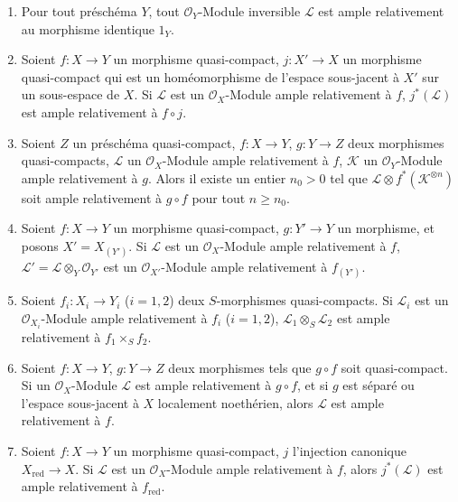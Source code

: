 \begin{proposition}[4.6.13]
\label{II.4.6.13-fr}
\begin{enumerate}
  \item[\rm{(i)}] Pour tout préschéma $Y$, tout
  $\mathcal{O}_Y$-Module inversible $\mathcal{L}$ est ample relativement
  au morphisme identique $1_Y$.
  \item[\rm{(i bis)}] Soient $f:X\to Y$ un morphisme quasi-compact,
  $j:X'\to X$ un morphisme quasi-compact qui est un homéomorphisme de
  l'espace sous-jacent à $X'$ sur un sous-espace de $X$. Si $\mathcal{L}$
  est un $\mathcal{O}_X$-Module ample relativement à $f$,
  $j^*(\mathcal{L})$ est ample relativement à $f\circ j$.
  \item[\rm{(ii)}] Soient $Z$ un préschéma quasi-compact, $f:X\to Y$,
  $g:Y\to Z$ deux morphismes quasi-compacts, $\mathcal{L}$ un
  $\mathcal{O}_X$-Module ample relativement à $f$, $\mathcal{K}$ un
  $\mathcal{O}_Y$-Module ample relativement à $g$. Alors il existe un
  entier $n_0>0$ tel que
  $\mathcal{L}\otimes f^*(\mathcal{K}^{\otimes n})$ soit ample relativement
  à $g\circ f$ pour tout $n\geq n_0$.
  \item[\rm{(iii)}] Soient $f:X\to Y$ un morphisme quasi-compact,
  $g:Y'\to Y$ un morphisme, et posons $X'=X_{(Y')}$. Si $\mathcal{L}$ est
  un $\mathcal{O}_X$-Module ample relativement à $f$,
  $\mathcal{L}'=\mathcal{L}\otimes_Y\mathcal{O}_{Y'}$ est un
  $\mathcal{O}_{X'}$-Module ample relativement à $f_{(Y')}$.
  \item[\rm{(iv)}] Soient $f_i:X_i\to Y_i$ ($i=1,2$) deux
  $S$-morphismes quasi-compacts. Si $\mathcal{L}_i$ est un
  $\mathcal{O}_{X_i}$-Module ample relativement à $f_i$ ($i=1,2$),
  $\mathcal{L}_1\otimes_S\mathcal{L}_2$ est ample relativement à
  $f_1\times_S f_2$.
  \item[\rm{(v)}] Soient $f:X\to Y$, $g:Y\to Z$ deux morphismes tels que
  $g\circ f$ soit quasi-compact. Si un $\mathcal{O}_X$-Module
  $\mathcal{L}$ est ample relativement à $g\circ f$, et si $g$ est séparé
  ou l'espace sous-jacent à $X$ localement noethérien, alors $\mathcal{L}$
  est ample relativement à $f$.


  \item[\rm{(vi)}] Soient $f:X\to Y$ un morphisme quasi-compact, $j$
  l'injection canonique $X_{\mathrm{red}}\to X$. Si $\mathcal{L}$ est un
  $\mathcal{O}_X$-Module ample relativement à $f$, alors
  $j^*(\mathcal{L})$ est ample relativement à $f_{\mathrm{red}}$.
\end{enumerate}
\end{proposition}

